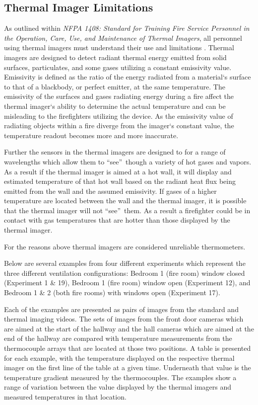 \documentclass[12pt,oneside]{book}
\begin{document}
\subsection{Thermal Imager Limitations}
As outlined within \textit{NFPA 1408: Standard for Training Fire Service Personnel in the Operation, Care, Use, and Maintenance of Thermal Imagers}, all personnel using thermal imagers must understand their use and limitations \cite{NFPA1408}. Thermal imagers are designed to detect radiant thermal energy emitted from solid surfaces, particulates, and some gases utilizing a constant emissivity value. Emissivity is defined as the ratio of the energy radiated from a material`s surface to that of a blackbody, or perfect emitter, at the same temperature. The emissivity of the surfaces and gases radiating energy during a fire affect the thermal imager`s ability to determine the actual temperature and can be misleading to the firefighters utilizing the device. As the emissivity value of radiating objects within a fire diverge from the imager`s constant value, the temperature readout becomes more and more inaccurate.

Further the sensors in the thermal imagers are designed to for a range of wavelengths which allow them to \textquotedblleft see\textquotedblright \ though a variety of hot gases and vapors. As a result if the thermal imager is aimed at a hot wall, it will display and estimated temperature of that hot wall based on the radiant heat flux being emitted from the wall and the assumed emissivity. If gases of a higher temperature are located between the wall and the thermal imager, it is possible that the thermal imager will not \textquotedblleft see\textquotedblright \ them. As a result a firefighter could be in contact with gas temperatures that are hotter than those displayed by the thermal imager.  

For the reasons above thermal imagers are considered unreliable thermometers.

Below are several examples from four different experiments which represent the three different ventilation configurations: Bedroom 1 (fire room) window closed (Experiment 1 \& 19), Bedroom 1 (fire room) window open (Experiment 12), and Bedroom 1 \& 2 (both fire rooms) with windows open (Experiment 17).   

Each of the examples are presented as pairs of images from the standard and thermal imaging videos. The sets of images from the front door cameras which are aimed at the start of the hallway and the hall cameras which are aimed at the end of the hallway are compared with temperature measurements from the thermocouple arrays that are located at those two positions. A table is presented for each example, with the temperature displayed on the respective thermal imager on the first line of the table at a given time.  Underneath that value is the temperature gradient measured by the thermocouples. The examples show a range of variation between the value displayed by the thermal imagers and measured temperatures in that location.  
\end{document}
